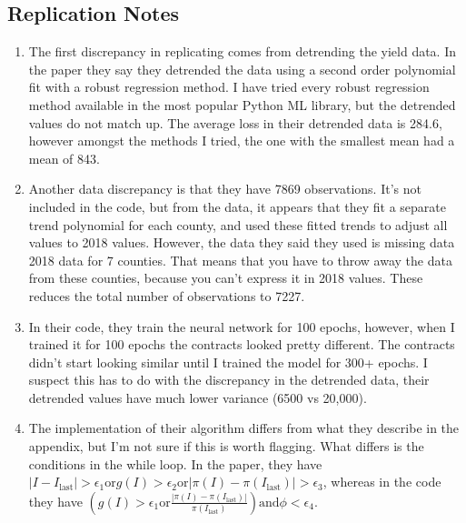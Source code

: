 \documentclass[11pt]{article}
\begin{document}
  \subsection{Replication Notes}
    \begin{enumerate}
        \item The first discrepancy in replicating comes from detrending the yield data. In the paper they say they detrended the data using a second order polynomial fit with a robust regression method. I have tried every robust regression method available in the most popular Python ML library, but the detrended values do not match up. The average loss in their detrended data is 284.6, however amongst the methods I tried, the one with the smallest mean had a mean of 843.
        \item Another data discrepancy is that they have 7869 observations. It's not included in the code, but from the data, it appears that they fit a separate trend polynomial for each county, and used these fitted trends to adjust all values to 2018 values. However, the data they said they used is missing data 2018 data for 7 counties. That means that you have to throw away the data from these counties, because you can't express it in 2018 values. These reduces the total number of observations to 7227. 
        \item In their code, they train the neural network for 100 epochs, however, when I trained it for 100 epochs the contracts looked pretty different. The contracts didn't start looking similar until I trained the model for 300+ epochs. I suspect this has to do with the discrepancy in the detrended data, their detrended values have much lower variance (6500 vs 20,000).
        \item The implementation of their algorithm differs from what they describe in the appendix, but I'm not sure if this is worth flagging. What differs is the conditions in the while loop. In the paper, they have $|I-I_{\text{last}}| > \epsilon_1 \text{or} g(I) > \epsilon_2 \text{or} |\pi(I)-\pi(I_{\text{last}})| > \epsilon_3$, whereas in the code they have $(g(I) > \epsilon_1 \text{or} \frac{|\pi(I)-\pi(I_{\text{last}})|}{\pi(I_{\text{last}})}) \text{and} \phi < \epsilon_4$.
    \end{enumerate}
  
\end{document}
